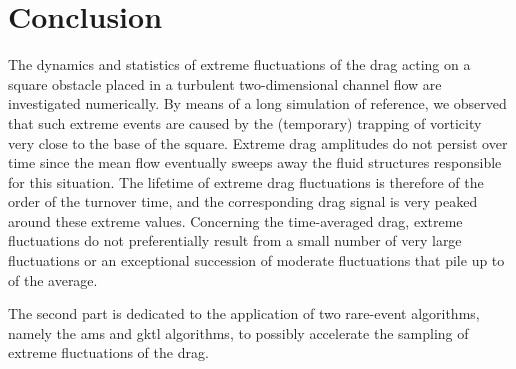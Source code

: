 \documentclass{jfm}
\newcommand{\EL}[1]{{\color{myred}{#1}}}
\begin{document}
\section{Conclusion}
\label{conlusion}


 
The dynamics and statistics of extreme fluctuations of the drag acting on a square obstacle placed in a turbulent two-dimensional channel flow are investigated numerically. 
By means of a long simulation of reference, we observed that such extreme events are caused by the (temporary) trapping of vorticity very close to the base of the square.
Extreme drag amplitudes do not persist over time since the mean flow eventually sweeps away the fluid structures responsible for this situation.
%
The lifetime of extreme drag fluctuations is therefore of the order of the turnover time, and the corresponding drag signal is very peaked around these extreme values.
Concerning the time-averaged drag, extreme fluctuations do not preferentially result from a small number of very large fluctuations or an exceptional succession of moderate fluctuations that pile up to \EL{yield a large value} of the average.

The second part is dedicated to the application of two rare-event algorithms, namely the \ac{ams} and \ac{gktl} algorithms, to possibly accelerate the sampling of extreme fluctuations of the drag. 
\end{document}
